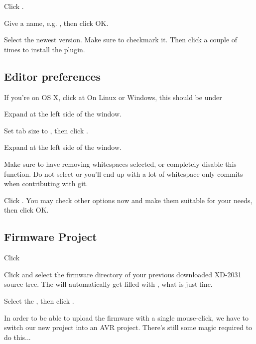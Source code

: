 Click .


\clearpage
Give a name, e.g. , then click OK.

Select the newest version. Make sure to checkmark it. Then click 
a couple of times to install the plugin.

\clearpage
\subsection{Editor preferences}
If you're on OS X, click at  
On Linux or Windows, this should be under

Expand  at the left side of the window.

Set tab size to , then click .


\clearpage
Expand  at the left side of the window.

Make sure to have removing whitespaces  selected, or completely disable
this function. Do not select  or you'll end up with a lot of whitespace only commits when contributing with git.

Click .  You may check other options now and make them suitable for your needs, then click OK.

\subsection{Firmware Project}
Click 

Click  and select the firmware directory of your previous downloaded \mbox{XD-2031} source
tree. The  will automatically get filled with , what is
just fine.

Select the , then click .


In order to be able to upload the firmware with a single mouse-click, we have to switch 
our new project into an AVR project. There's still some magic required to do this...

